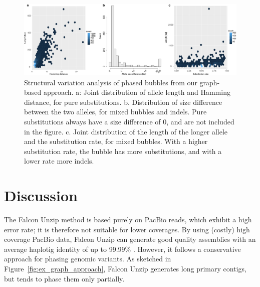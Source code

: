 \begin{figure}[t!]
\begin{center}
\includegraphics[width=\textwidth]{bubble-breakdown}%
\end{center}
\caption{Structural variation analysis of phased bubbles from our graph-based approach.
a: Joint distribution of allele length and Hamming distance, for pure substitutions.
b. Distribution of size difference between the two alleles, for mixed bubbles and indels. 
Pure substitutions always have a size difference of 0, and are not included in the figure.
c. Joint distribution of the length of the longer allele and the substitution rate, for mixed bubbles.
With a higher substitution rate, the bubble has more substitutions, and with a lower rate more indels.
}
\label{fig:bubble_breakdown}
\end{figure}

\section{Discussion}
The Falcon Unzip method \citep{chin2016phased} is based purely on PacBio reads, which exhibit a high error rate; it is therefore not suitable for lower coverages.
By using (costly) high coverage PacBio data, Falcon Unzip can generate good quality assemblies with an average haplotig identity of up to 99.99\% \citep{chin2016phased}.
However, it follows a conservative approach for phasing genomic variants.
As sketched in Figure~\ref{fig:ex_graph_approach}, Falcon Unzip generates long primary contigs, but tends to phase them only partially.

